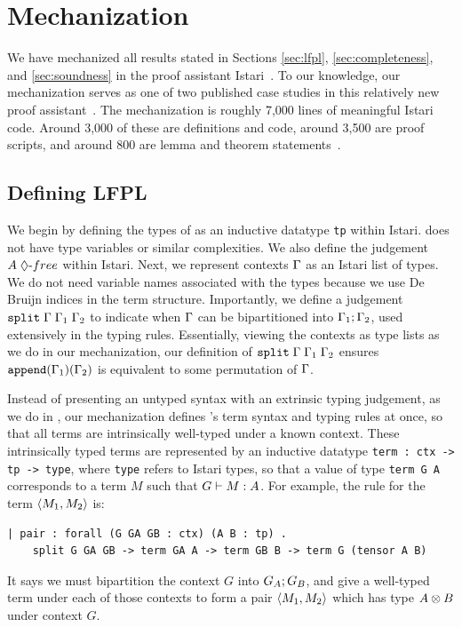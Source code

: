 \section{Mechanization}
\label{sec:mechanization}

We have mechanized all results stated in Sections \ref{sec:lfpl}, \ref{sec:completeness}, and \ref{sec:soundness} in the proof assistant Istari~\cite{istariProofAssistant}. To our knowledge, our mechanization serves as one of two published case studies in this relatively new proof assistant~\cite{Li2026}. The mechanization is roughly 7,000 lines of meaningful Istari code. Around 3,000 of these are definitions and \lfpl code, around 3,500 are proof scripts, and around 800 are lemma and theorem statements~\cite{mechanization}.

\subsection{Defining LFPL}
\enlargethispage{\baselineskip}

We begin by defining the types of \lfpl as an inductive datatype \lstinline{tp} within Istari. \lfpl does not have type variables or similar complexities. We also define the judgement $\dfree{A}$ within Istari. Next, we represent contexts $\Gamma$ as an Istari list of \lfpl types. We do not need variable names associated with the types because we use De Bruijn indices in the term structure. Importantly, we define a judgement $\mathtt{split} \; \Gamma \; \Gamma_1 \; \Gamma_2$ to indicate when $\Gamma$ can be  bipartitioned into $\Gamma_1 ; \Gamma_2$, used extensively in the typing rules. Essentially, viewing the contexts as type lists as we do in our mechanization, our definition of $\mathtt{split} \; \Gamma \; \Gamma_1 \; \Gamma_2$ ensures $\mathtt{append}(\Gamma_1)(\Gamma_2)$ is equivalent to some permutation of $\Gamma$.

Instead of presenting an untyped syntax with an extrinsic typing judgement, as we do in , our mechanization defines \lfpl's term syntax and typing rules at once, so that all terms are intrinsically well-typed under a known context. These intrinsically typed terms are represented by an inductive datatype \lstinline{term : ctx -> tp -> type}, where \lstinline{type} refers to Istari types, so that a value of type \lstinline{term G A} corresponds to a term $M$ such that $G \vdash M : A$. For example, the rule for the term $\tmpair{M_1}{M_2}$ is:
\begin{lstlisting}
| pair : forall (G GA GB : ctx) (A B : tp) .
    split G GA GB -> term GA A -> term GB B -> term G (tensor A B)
\end{lstlisting}
It says we must bipartition the context $G$ into $G_A ; G_B$, and give a well-typed term under each of those contexts to form a pair $\tmpair{M_1}{M_2}$ which has type $\tptens{A}{B}$ under context $G$.



